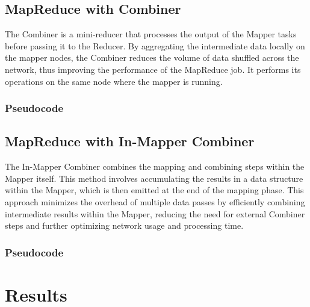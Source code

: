 \documentclass[a4paper, 12pt]{article}
\begin{document}
\subsection{MapReduce with Combiner}
The Combiner is a mini-reducer that processes the output of the Mapper tasks before passing it to the Reducer. By aggregating the intermediate data locally on the mapper nodes, the Combiner reduces the volume of data shuffled across the network, thus improving the performance of the MapReduce job. It performs its operations on the same node where the mapper is running.
\subsubsection{Pseudocode}

\subsection{MapReduce with In-Mapper Combiner}
The In-Mapper Combiner combines the mapping and combining steps within the Mapper itself. This method involves accumulating the results in a data structure within the Mapper, which is then emitted at the end of the mapping phase. This approach minimizes the overhead of multiple data passes by efficiently combining intermediate results within the Mapper, reducing the need for external Combiner steps and further optimizing network usage and processing time.
\subsubsection{Pseudocode}



\section{Results}
\end{document}
